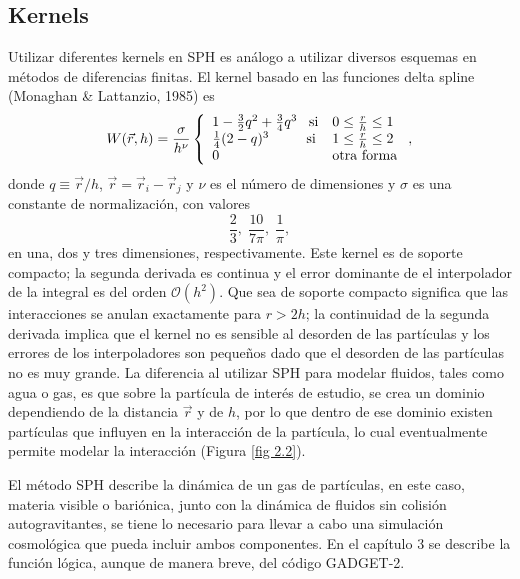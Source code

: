 \documentclass[a4paper,openright,12pt]{book}
\begin{document}
\subsection{Kernels}
Utilizar diferentes kernels en SPH es análogo a utilizar diversos esquemas en métodos de diferencias finitas. El kernel basado en las funciones delta spline (Monaghan \& Lattanzio, 1985) \cite{b8.1} es
\begin{equation}
W(\vec{r},h) = \frac{\sigma}{h^{\nu}} \left\lbrace
\begin{array}{ll}
1- \frac{3}{2}q^{2} +\frac{3}{4}q^{3} \;\;\;\textup{si} & 0 \leq \frac{r}{h} \leq 1\\

\frac{1}{4}(2-q)^{3} \;\;\;\;\;\;\,\,\,\,\,\, \textup{si} & 1 \leq \frac{r}{h} \leq 2\\
0 & \textup{otra forma}
\end{array}
\right.,\label{eqn 2.43}
\end{equation}
donde $ q\equiv \vec{r}/h$, $\vec{r}=\vec{r}_{i} - \vec{r}_{j}$ y $\nu$ es el número de dimensiones y $\sigma$ es una constante de normalización, con valores
\begin{equation*}
\frac{2}{3}, \; \frac{10}{7\pi}, \; \frac{1}{\pi},
\end{equation*}
en una, dos y tres dimensiones, respectivamente. Este kernel es de soporte compacto; la segunda derivada es continua y el error dominante de el interpolador de la integral es del orden $\mathcal{O}(h^{2})$. Que sea de soporte compacto significa que las interacciones se anulan exactamente para $r>2h$; la continuidad de la segunda derivada implica que el kernel no es sensible al desorden de las partículas y los errores de los interpoladores son pequeños dado que el desorden de las partículas no es muy grande. La diferencia al utilizar SPH para modelar fluidos, tales como agua o gas, es que sobre la partícula de interés de estudio, se crea un dominio dependiendo de la distancia $\vec{r}$ y de $h$, por lo que dentro de ese dominio existen partículas que influyen en la interacción de la partícula, lo cual eventualmente permite modelar la interacción (Figura \ref{fig 2.2}).


El método SPH describe la dinámica de un gas de partículas, en este caso, materia visible o bariónica, junto con la dinámica de fluidos sin colisión autogravitantes, se tiene lo necesario para llevar a cabo una simulación cosmológica que pueda incluir ambos componentes. En el capítulo 3 se describe la función lógica, aunque de manera breve, del código GADGET-2.
\end{document}
